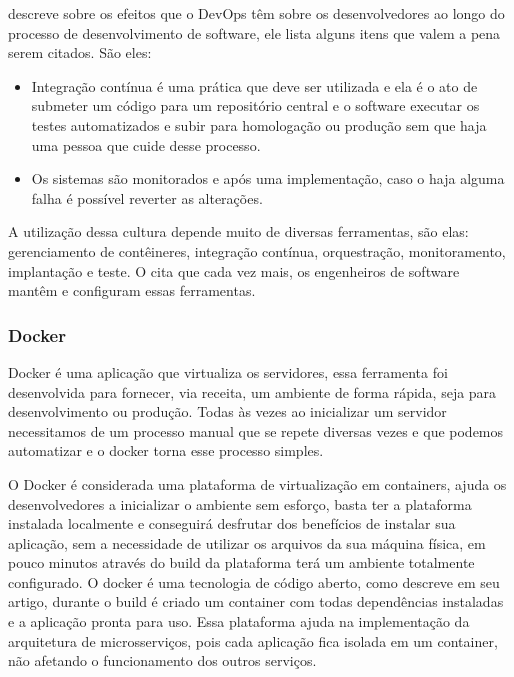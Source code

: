\cite{Zhu2016} descreve sobre os efeitos que o DevOps têm sobre os desenvolvedores ao longo do processo de desenvolvimento de software, ele lista alguns itens que valem a pena serem citados. São eles: 

\begin{itemize}
    \item Integração contínua é uma prática que deve ser utilizada e ela é o ato de submeter um código para um repositório central e o software executar os testes automatizados e subir para homologação ou produção sem que haja uma pessoa que cuide desse processo.
    \item Os sistemas são monitorados e após uma implementação, caso o haja alguma falha é possível reverter as alterações.
\end{itemize}

A utilização dessa cultura depende muito de diversas ferramentas, são elas: gerenciamento de contêineres, integração contínua, orquestração, monitoramento, implantação e teste. O \cite{Zhu2016} cita que cada vez mais, os engenheiros de software mantêm e configuram essas ferramentas.


\subsubsection{Docker}

Docker é uma aplicação que virtualiza os servidores, essa ferramenta foi desenvolvida para fornecer, via receita, um ambiente de forma rápida, seja para desenvolvimento ou produção. Todas às vezes ao inicializar um servidor necessitamos de um processo manual que se repete diversas vezes e que podemos automatizar e o docker torna esse processo simples. 

O Docker é considerada uma plataforma de virtualização em containers, ajuda os desenvolvedores a inicializar o ambiente sem esforço, basta ter a plataforma instalada localmente e conseguirá desfrutar dos benefícios de instalar sua aplicação, sem a necessidade de utilizar os arquivos da sua máquina física, em pouco minutos através do build da plataforma terá um ambiente totalmente configurado. O docker é uma tecnologia de código aberto, como \cite{Ouverney2017} descreve em seu artigo, durante o build é criado um container com todas dependências instaladas e a aplicação pronta para uso. Essa plataforma ajuda na implementação da arquitetura de microsserviços, pois cada aplicação fica isolada em um container, não afetando o funcionamento dos outros serviços.

